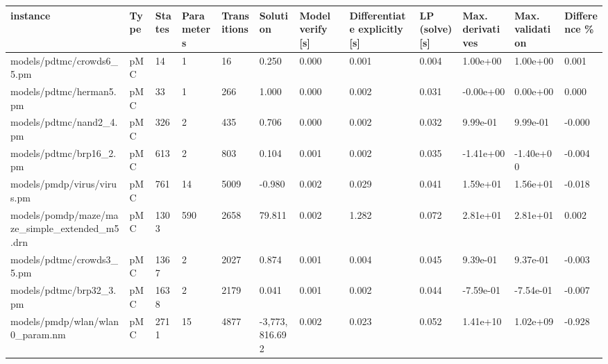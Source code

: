 \begin{tabular}{llllllllllll}
\toprule
                                          instance & Type & States & Parameters & Transitions &       Solution & Model verify [s] & Differentiate explicitly [s] & LP (solve) [s] & Max. derivatives & Max. validation & Difference \% \\
\midrule
                         models/pdtmc/crowds6\_5.pm &  pMC &     14 &          1 &          16 &          0.250 &            0.000 &                        0.001 &          0.004 &         1.00e+00 &        1.00e+00 &        0.001 \\
                           models/pdtmc/herman5.pm &  pMC &     33 &          1 &         266 &          1.000 &            0.000 &                        0.002 &          0.031 &        -0.00e+00 &        0.00e+00 &        0.000 \\
                           models/pdtmc/nand2\_4.pm &  pMC &    326 &          2 &         435 &          0.706 &            0.000 &                        0.002 &          0.032 &         9.99e-01 &        9.99e-01 &       -0.000 \\
                           models/pdtmc/brp16\_2.pm &  pMC &    613 &          2 &         803 &          0.104 &            0.001 &                        0.002 &          0.035 &        -1.41e+00 &       -1.40e+00 &       -0.004 \\
                        models/pmdp/virus/virus.pm &  pMC &    761 &         14 &        5009 &         -0.980 &            0.002 &                        0.029 &          0.041 &         1.59e+01 &        1.56e+01 &       -0.018 \\
     models/pomdp/maze/maze\_simple\_extended\_m5.drn &  pMC &   1303 &        590 &        2658 &         79.811 &            0.002 &                        1.282 &          0.072 &         2.81e+01 &        2.81e+01 &        0.002 \\
                         models/pdtmc/crowds3\_5.pm &  pMC &   1367 &          2 &        2027 &          0.874 &            0.001 &                        0.004 &          0.045 &         9.39e-01 &        9.37e-01 &       -0.003 \\
                           models/pdtmc/brp32\_3.pm &  pMC &   1638 &          2 &        2179 &          0.041 &            0.001 &                        0.002 &          0.044 &        -7.59e-01 &       -7.54e-01 &       -0.007 \\
                   models/pmdp/wlan/wlan0\_param.nm &  pMC &   2711 &         15 &        4877 & -3,773,816.692 &            0.002 &                        0.023 &          0.052 &         1.41e+10 &        1.02e+09 &       -0.928 \\

\end{tabular}
